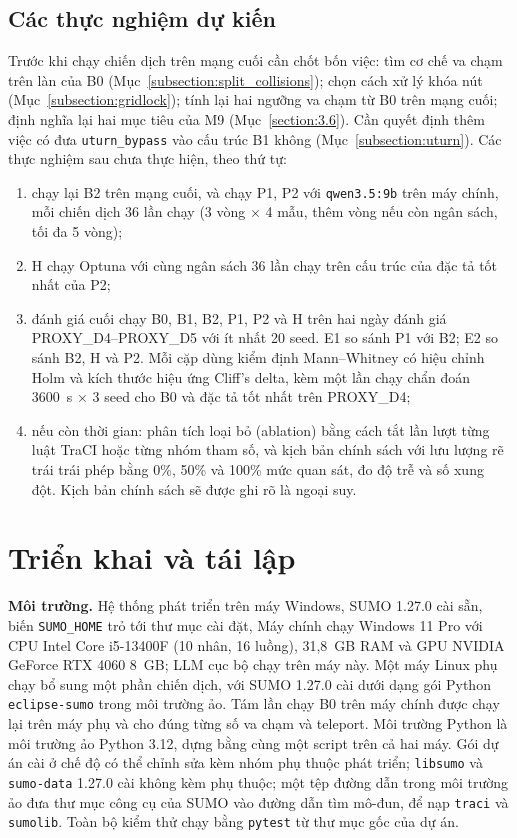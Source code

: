 \documentclass[../DoAn.tex]{subfiles}
\begin{document}
\subsection{Các thực nghiệm dự kiến}
\label{subsection:planned_experiments}

Trước khi chạy chiến dịch trên mạng cuối cần chốt bốn việc: tìm cơ chế va chạm trên làn của B0 (Mục~\ref{subsection:split_collisions}); chọn cách xử lý khóa nút (Mục~\ref{subsection:gridlock}); tính lại hai ngưỡng va chạm từ B0 trên mạng cuối; định nghĩa lại hai mục tiêu của M9 (Mục~\ref{section:3.6}). Cần quyết định thêm việc có đưa \texttt{uturn\_bypass} vào cấu trúc B1 không (Mục~\ref{subsection:uturn}). Các thực nghiệm sau chưa thực hiện, theo thứ tự:
\begin{enumerate}[label=(\arabic*)]
    \item chạy lại B2 trên mạng cuối, và chạy P1, P2 với \texttt{qwen3.5:9b} trên máy chính, mỗi chiến dịch 36 lần chạy (3 vòng $\times$ 4 mẫu, thêm vòng nếu còn ngân sách, tối đa 5 vòng);
    \item H chạy Optuna với cùng ngân sách 36 lần chạy trên cấu trúc của đặc tả tốt nhất của P2;
    \item đánh giá cuối chạy B0, B1, B2, P1, P2 và H trên hai ngày đánh giá PROXY\_D4--PROXY\_D5 với ít nhất 20 seed. E1 so sánh P1 với B2; E2 so sánh B2, H và P2. Mỗi cặp dùng kiểm định Mann--Whitney có hiệu chỉnh Holm và kích thước hiệu ứng Cliff's delta, kèm một lần chạy chẩn đoán 3600~s $\times$ 3 seed cho B0 và đặc tả tốt nhất trên PROXY\_D4;
    \item nếu còn thời gian: phân tích loại bỏ (ablation) bằng cách tắt lần lượt từng luật TraCI hoặc từng nhóm tham số, và kịch bản chính sách với lưu lượng rẽ trái trái phép bằng 0\%, 50\% và 100\% mức quan sát, đo độ trễ và số xung đột. Kịch bản chính sách sẽ được ghi rõ là ngoại suy.
\end{enumerate}

\section{Triển khai và tái lập}
\label{section:deploy}

\textbf{Môi trường.} Hệ thống phát triển trên máy Windows, SUMO 1.27.0 cài sẵn, biến \texttt{SUMO\_HOME} trỏ tới thư mục cài đặt, Máy chính chạy Windows 11 Pro với CPU Intel Core i5-13400F (10 nhân, 16 luồng), 31,8~GB RAM và GPU NVIDIA GeForce RTX 4060 8~GB; LLM cục bộ chạy trên máy này. Một máy Linux phụ chạy bổ sung một phần chiến dịch, với SUMO 1.27.0 cài dưới dạng gói Python \texttt{eclipse-sumo} trong môi trường ảo. Tám lần chạy B0 trên máy chính được chạy lại trên máy phụ và cho đúng từng số va chạm và teleport. Môi trường Python là môi trường ảo Python 3.12, dựng bằng cùng một script trên cả hai máy. Gói dự án cài ở chế độ có thể chỉnh sửa kèm nhóm phụ thuộc phát triển; \texttt{libsumo} và \texttt{sumo-data} 1.27.0 cài không kèm phụ thuộc; một tệp đường dẫn trong môi trường ảo đưa thư mục công cụ của SUMO vào đường dẫn tìm mô-đun, để nạp \texttt{traci} và \texttt{sumolib}. Toàn bộ kiểm thử chạy bằng \texttt{pytest} từ thư mục gốc của dự án.
\end{document}
